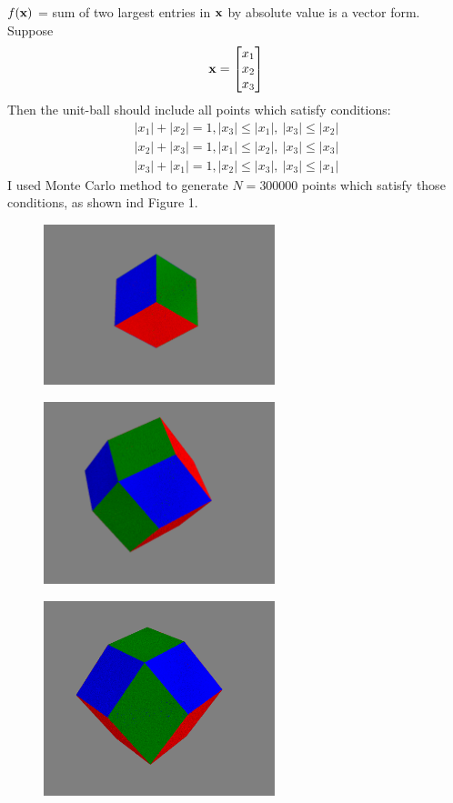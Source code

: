 \documentclass{article}
\begin{document}
$f(\boldsymbol{\mathrm{x}})$ = sum of two largest entries in $\boldsymbol{\mathrm{x}}$ by absolute value is a vector form. \\
Suppose
\begin {gather*}
\boldsymbol{\mathrm{x}}=\begin{bmatrix} x_1\\ x_2\\ x_3 \end{bmatrix}  
\end{gather*}  
Then the unit-ball should include all points which satisfy conditions:  
\begin {gather*}
|x_1|+|x_2|= 1, |x_3|\leq |x_1| , \  |x_3|\leq|x_2|\\
|x_2|+|x_3|= 1, |x_1|\leq |x_2| , \  |x_3|\leq|x_3|\\
|x_3|+|x_1|= 1, |x_2|\leq |x_3| , \  |x_3|\leq|x_1|
\end{gather*}  
I used Monte Carlo method to generate $N=300000 $ points which satisfy those conditions, as shown ind Figure 1. 
\begin{figure}
\includegraphics[width=0.6\textwidth]{figure1}
\centering
\end{figure} 

\begin{figure}
\includegraphics[width=0.6\textwidth]{figure2}
\centering
\end{figure} 

\begin{figure}
\includegraphics[width=0.6\textwidth]{figure3}
\centering
\end{figure} 
\end{document}
